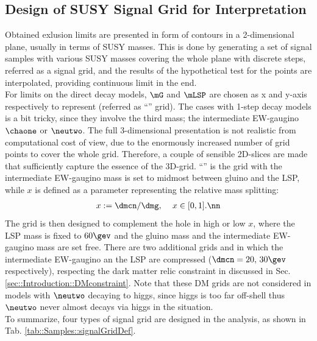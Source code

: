 

\subsection{Design of SUSY Signal Grid for Interpretation} 
Obtained exlusion limits are presented in form of contours in a 2-dimensional plane, usually in terms of SUSY masses. This is done by generating a set of signal samples with various SUSY masses covering the whole plane with discrete steps, referred as a signal grid, and the results of the hypothetical test for the points are interpolated, providing continuous limit in the end. \\

For limits on the direct decay models, $\mG$ and $\mLSP$ are chosen as x and y-axis respectively to represent (referred as ``\dire'' grid). The cases with 1-step decay models is a bit tricky, since they involve the third mass; the intermediate EW-gaugino $\chaone$ or $\neutwo$. The full 3-dimensional presentation is not realistic from computational cost of view, due to the enormously increased number of grid points to cover the whole grid. Therefore, a couple of sensible 2D-slices are made that sufficiently capture the essence of the 3D-grid. ``\xhalf'' is the grid with the intermediate EW-gaugino mass is set to midmost between gluino and the LSP, while $x$ is defined as a parameter representing the relative mass splitting:
\begin{align}
  x := \dmcn/\dmg, \,\,\,\,\,\,\, x \in [0,1]. \nn
\end{align}
The \varx grid is then designed to complement the hole in high or low $x$, where the LSP mass is fixed to $60\gev$ and the gluino mass and the intermediate EW-gaugino mass are set free. There are two additional grids \DMtw and \DMth in which the intermediate EW-gaugino an the LSP are compressed ($\dmcn=20, \, 30\gev$ respectively), respecting the dark matter relic constraint in discussed in Sec. \ref{sec::Introduction::DMconstraint}. Note that these DM grids are not considered in models with $\neutwo$ decaying to higgs, since higgs is too far off-shell thus $\neutwo$ never almost decays via higgs in the situation. \\
To summarize, four types of signal grid are designed in the analysis, as shown in Tab. \ref{tab::Samples::signalGridDef}. 


